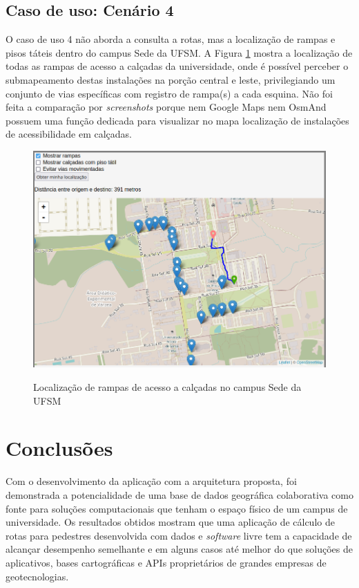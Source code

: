 \documentclass[oneside,openright,12pt]{ufsm_2015} %
\begin{document}
\section{Caso de uso: Cenário 4}
O caso de uso 4 não aborda a consulta a rotas, mas a localização de rampas e pisos táteis dentro do campus Sede da UFSM. 
A Figura \ref{fig:rampas_mapa} mostra a localização de todas as rampas de acesso a calçadas da universidade, onde é possível perceber o submapeamento destas instalações na porção central e leste, privilegiando um conjunto de vias específicas com registro de rampa(s) a cada esquina. 
Não foi feita a comparação por \textit{ screenshots} porque nem Google Maps nem OsmAnd possuem uma função dedicada para visualizar no mapa localização de instalações de acessibilidade em calçadas.
\begin{figure}[h!]
    \caption{Localização de rampas de acesso a calçadas no campus Sede da UFSM}
    \centering
    \includegraphics[scale=0.4]{imagens/rampas_mapa.png}
    \label{fig:rampas_mapa}
\end{figure}



\chapter{Conclusões}
\label{sec:conclusoes}

Com o desenvolvimento da aplicação com a arquitetura proposta, foi demonstrada a potencialidade de uma base de dados geográfica colaborativa como fonte para soluções computacionais que tenham o espaço físico de um campus de universidade. Os resultados obtidos mostram que uma aplicação de cálculo de rotas para pedestres desenvolvida com dados e \textit{software} livre tem a capacidade de alcançar desempenho semelhante e em alguns casos até melhor do que soluções de aplicativos, bases cartográficas e APIs proprietários de grandes empresas de geotecnologias.
\end{document}
